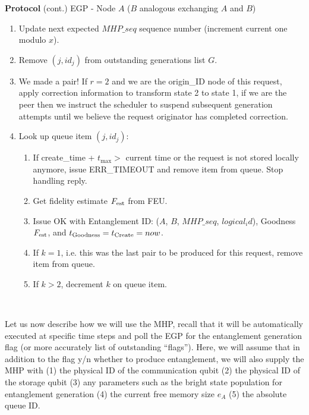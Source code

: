 \documentclass{article}
\makeatletter
\newcounter{Lprotocol}
\newenvironment{Lprotocol}[1]
  {\par\addvspace{\topsep}
   \noindent
   \tabularx{\linewidth}{@{} X @{}}
    \hline
    \refstepcounter{Lprotocol}\textbf{Protocol \theLprotocol} #1 \\
    \hline}
  { \\
    \hline
   \endtabularx
   \par\addvspace{\topsep}}
\makeatother
\begin{document}
\pagebreak

\addtocounter{Lprotocol}{-1}
\begin{Lprotocol}{(cont.) EGP - Node $A$ ($B$ analogous exchanging $A$ and $B$)}
\begin{enumerate}
   \begin{enumerate}
   \begin{enumerate}
   \setcounter{enumiii}{\theenumTemp}
    \item Update next expected $MHP\_seq$ sequence number (increment current one modulo $x$).
     \item Remove $(j,id_j)$ from outstanding generations list $G$.
     \item We made a pair! If $r=2$ and we are the origin\_ID node of this request, apply correction information to transform state 2 to state 1, if we are the peer then we instruct the scheduler to suspend subsequent generation attempts until we believe the request originator has completed correction.
     \item Look up queue item $(j,id_j)$:
	 \begin{enumerate}
		\item If create\_time + $t_{\max} >$ current time or the request is not stored locally anymore, issue ERR\_TIMEOUT and remove item from queue. Stop handling reply.
		\item Get fidelity estimate $F_{\rm est}$ from FEU.
		\item Issue OK with Entanglement ID: ($A$, $B$, $MHP\_seq$, $logical_id$), Goodness $F_{\rm est}$, and $t_{\rm Goodness} = t_{\rm Create} = now$.
		\item If $k = 1$, i.e. this was the last pair to be produced for this request, remove item from queue.
		\item If $k > 2$, decrement $k$ on queue item.
	 \end{enumerate}
	\end{enumerate}
  \end{enumerate}
\end{enumerate}

\end{Lprotocol}

Let us now describe how we will use the MHP, recall that it will be automatically executed at specific time steps and poll the EGP for the entanglement generation flag (or more accurately list of outstanding ``flags''). Here, we will assume that in addition to the flag y/n whether to produce entanglement, we will also supply the MHP with (1) the physical ID of the communication qubit (2) the physical ID of the storage qubit (3) any parameters such as the bright state population for entanglement generation (4) the current free memory size $e_A$  (5) the absolute queue ID.
\end{document}
